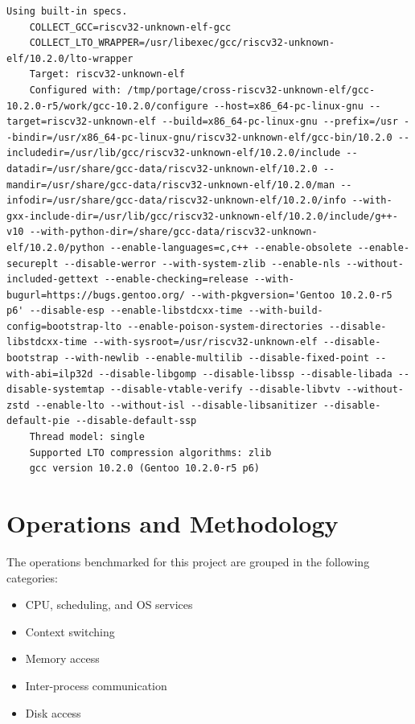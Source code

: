\documentclass{article}
\begin{document}
\begin{lstlisting}[caption={RISC-V RV32 cross-compiler configurations}, label={lst:gentoo-riscv}]
    Using built-in specs.
    COLLECT_GCC=riscv32-unknown-elf-gcc
    COLLECT_LTO_WRAPPER=/usr/libexec/gcc/riscv32-unknown-elf/10.2.0/lto-wrapper
    Target: riscv32-unknown-elf
    Configured with: /tmp/portage/cross-riscv32-unknown-elf/gcc-10.2.0-r5/work/gcc-10.2.0/configure --host=x86_64-pc-linux-gnu --target=riscv32-unknown-elf --build=x86_64-pc-linux-gnu --prefix=/usr --bindir=/usr/x86_64-pc-linux-gnu/riscv32-unknown-elf/gcc-bin/10.2.0 --includedir=/usr/lib/gcc/riscv32-unknown-elf/10.2.0/include --datadir=/usr/share/gcc-data/riscv32-unknown-elf/10.2.0 --mandir=/usr/share/gcc-data/riscv32-unknown-elf/10.2.0/man --infodir=/usr/share/gcc-data/riscv32-unknown-elf/10.2.0/info --with-gxx-include-dir=/usr/lib/gcc/riscv32-unknown-elf/10.2.0/include/g++-v10 --with-python-dir=/share/gcc-data/riscv32-unknown-elf/10.2.0/python --enable-languages=c,c++ --enable-obsolete --enable-secureplt --disable-werror --with-system-zlib --enable-nls --without-included-gettext --enable-checking=release --with-bugurl=https://bugs.gentoo.org/ --with-pkgversion='Gentoo 10.2.0-r5 p6' --disable-esp --enable-libstdcxx-time --with-build-config=bootstrap-lto --enable-poison-system-directories --disable-libstdcxx-time --with-sysroot=/usr/riscv32-unknown-elf --disable-bootstrap --with-newlib --enable-multilib --disable-fixed-point --with-abi=ilp32d --disable-libgomp --disable-libssp --disable-libada --disable-systemtap --disable-vtable-verify --disable-libvtv --without-zstd --enable-lto --without-isl --disable-libsanitizer --disable-default-pie --disable-default-ssp
    Thread model: single
    Supported LTO compression algorithms: zlib
    gcc version 10.2.0 (Gentoo 10.2.0-r5 p6)
\end{lstlisting}

\section{Operations and Methodology}

The operations benchmarked for this project are grouped in the following categories:

\begin{itemize}
    \item CPU, scheduling, and OS services
    \item Context switching
    \item Memory access
    \item Inter-process communication
    \item Disk access
\end{itemize}
\end{document}
